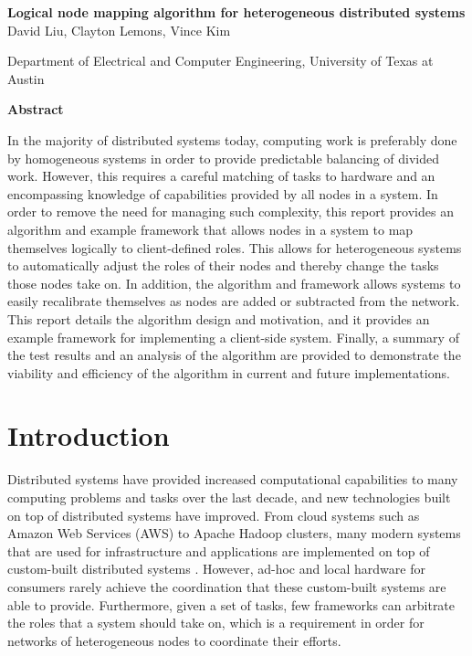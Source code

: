 \documentclass[11pt]{article}
\begin{document}
\newpage
\begin{center}
{\Large \textbf{Logical node mapping algorithm for heterogeneous distributed systems}}\\[1.0cm]
David Liu, Clayton Lemons, Vince Kim

\vspace{.1 in}
Department of Electrical and Computer Engineering, University of Texas at Austin

\vspace{.1 in}
\end{center}
\begin{multicols}{2}
\begin{center}

\textbf{Abstract}
\end{center}
In the majority of distributed systems today, computing work is preferably done by homogeneous systems in order to provide predictable balancing of divided work. However, this requires a careful matching of tasks to hardware and an encompassing knowledge of capabilities provided by all nodes in a system. In order to remove the need for managing such complexity, this report provides an algorithm and example framework that allows nodes in a system to map themselves logically to client-defined roles. This allows for heterogeneous systems to automatically adjust the roles of their nodes and thereby change the tasks those nodes take on. In addition, the algorithm and framework allows systems to easily recalibrate themselves as nodes are added or subtracted from the network. This report details the algorithm design and motivation, and it provides an example framework for implementing a client-side system. Finally, a summary of the test results and an analysis of the algorithm are provided to demonstrate the viability and efficiency of the algorithm in current and future implementations.

\section{Introduction}
Distributed systems have provided increased computational capabilities to many computing problems and tasks over the last decade, and new technologies built on top of distributed systems have improved. From cloud systems such as Amazon Web Services (AWS) to Apache Hadoop clusters, many modern systems that are used for infrastructure and applications are implemented on top of custom-built distributed systems \cite{aws} \cite{hadoop}. However, ad-hoc and local hardware for consumers rarely achieve the coordination that these custom-built systems are able to provide.  Furthermore, given a set of tasks, few frameworks can arbitrate the roles that a system should take on, which is a requirement in order for networks of heterogeneous nodes to coordinate their efforts.


\end{multicols}
\end{document}
